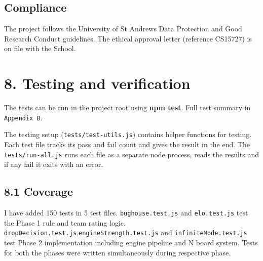 \documentclass[11pt,a4paper]{article}
\begin{document}
\subsection*{Compliance}
The project follows the University of St Andrews Data Protection and Good Research Conduct guidelines. The ethical approval letter (reference CS15727) is on file with the School.

\newpage
\section*{8. Testing and verification}

The tests can be run in the project root using \textbf{npm test}. Full test summary in \texttt{Appendix B}.

The testing setup (\texttt{tests/test-utils.js}) contains helper functions for testing. Each test file tracks its pass and fail count and gives the result in the end. The \texttt{tests/run-all.js} runs each file as a separate node process, reads the results and if any fail it exits with an error. 

\subsection*{8.1 Coverage}

I have added 150 tests in 5 test files.  \texttt{bughouse.test.js} and \texttt{elo.test.js} test the Phase 1 rule and team rating logic. \texttt{dropDecision.test.js},\texttt{engineStrength.test.js} and \texttt{infiniteMode.test.js} test Phase 2 implementation including engine pipeline and N board system. Tests for both the phases were written simultaneously during respective phase.
\end{document}
